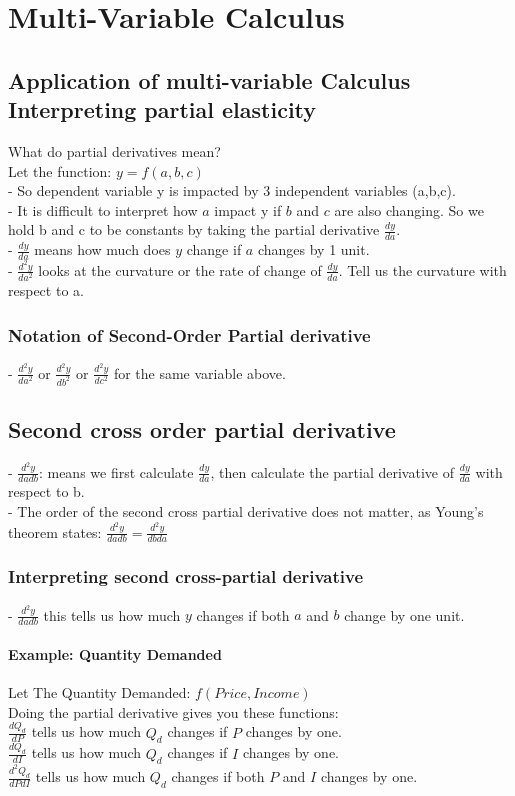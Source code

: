 \documentclass{book}
\begin{document}
\chapter{Multi-Variable Calculus}
\date{11/28/2018}
    \section{Application of multi-variable Calculus\\ Interpreting partial elasticity}
    What do partial derivatives mean?\\
    Let the function: $y = f(a,b,c)$\\
    - So dependent variable y is impacted by 3 independent variables (a,b,c).\\
    - It is difficult to interpret how $a$ impact y if $b$ and $c$ are also changing.
    So we hold b and c to be constants by taking the partial derivative $\frac{dy}{da}$.\\
    - $\frac{dy}{da}$ means how much does $y$ change if $a$ changes by 1 unit.\\
    - $\frac{d^2y}{da^2}$ looks at the curvature or the rate of change of $\frac{dy}{da}$. Tell us the curvature with respect to a.
    \subsection{Notation of Second-Order Partial derivative}
        - $\frac{d^2y}{da^2}$ or $\frac{d^2y}{db^2}$ or $\frac{d^2y}{dc^2}$ for the same variable above.
    \section{Second cross order partial derivative}
    - $\frac{d^2y}{dadb}$: means we first calculate $\frac{dy}{da}$, then calculate the partial derivative of $\frac{dy}{da}$ with respect to b.\\
    - The order of the second cross partial derivative does not matter, as Young's theorem states: $\frac{d^2y}{dadb} = \frac{d^2y}{dbda}$
    \subsection{Interpreting second cross-partial derivative}
    - $\frac{d^2y}{dadb}$ this tells us how much $y$ changes if both $a$ and $b$ change by one unit.
    \subsubsection{Example: Quantity Demanded}
    Let The Quantity Demanded: $f(Price,Income)$\\
    Doing the partial derivative gives you these functions:\\
    $\frac{dQ_d}{dP}$ tells us how much $Q_d$ changes if $P$ changes by one.\\
    $\frac{dQ_d}{dI}$ tells us how much $Q_d$ changes if $I$ changes by one.\\
    $\frac{d^2Q_d}{dPdI}$ tells us how much $Q_d$ changes if both $P$ and $I$ changes by one.
\end{document}
